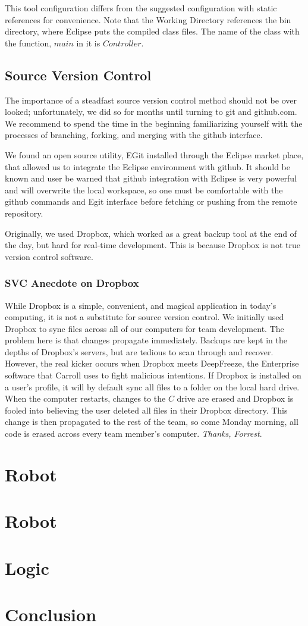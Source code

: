 \documentclass[12pt]{article}
\begin{document}
This tool configuration differs from the suggested configuration with static references for convenience.  Note that the Working Directory references the bin directory, where Eclipse puts the compiled class files.  The name of the class with the function, $main$ in it is $Controller$.

\subsection{Source Version Control}
The importance of a steadfast source version control method should not be over looked; unfortunately, we did so for months until turning to git and github.com.  We recommend to spend the time in the beginning familiarizing yourself with the processes of branching, forking, and merging with the github interface.  

We found an open source utility, EGit installed through the Eclipse market place, that allowed us to integrate the Eclipse environment with github.  It should be known and user be warned that github integration with Eclipse is very powerful and will overwrite the local workspace, so one must be comfortable with the github commands and Egit interface before fetching or pushing from the remote repository.

Originally, we used Dropbox, which worked as a great backup tool at the end of the day, but hard for real-time development.  This is because Dropbox is not true version control software.

\subsubsection*{SVC Anecdote on Dropbox}
While Dropbox is a simple, convenient, and magical application in today's computing, it is not a substitute for source version control.  We initially used Dropbox to sync files across all of our computers for team development.  The problem here is that changes propagate immediately.  Backups are kept in the depths of Dropbox's servers, but are tedious to scan through and recover.  However, the real kicker occurs when Dropbox meets DeepFreeze, the Enterprise software that Carroll uses to fight malicious intentions.  If Dropbox is installed on a user's profile, it will by default sync all files to a folder on the local hard drive.  When the computer restarts, changes to the $C$ drive are erased and Dropbox is fooled into believing the user deleted all files in their Dropbox directory.  This change is then propagated to the rest of the team, so come Monday morning, all code is erased across every team member's computer.  \textit{Thanks, Forrest}.

\clearpage
\section{Robot}

\section{Robot}

\section{Logic}

\section{Conclusion}
\end{document}
